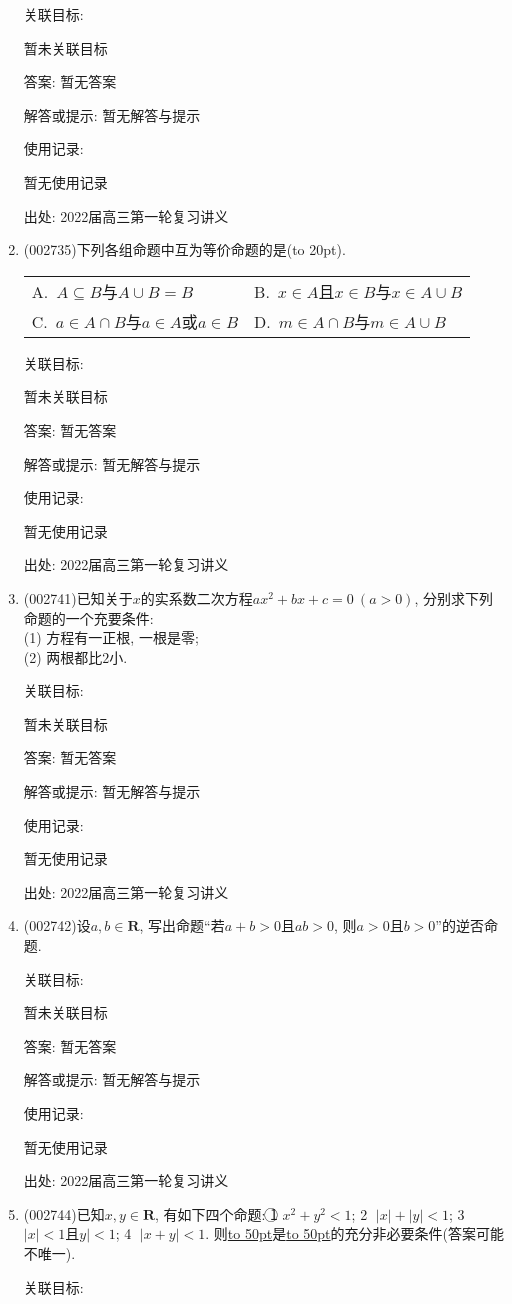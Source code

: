 \documentclass[10pt,a4paper]{article}
\newcommand{\blank}[1]{\underline{\hbox to #1pt{}}}
\newcommand{\bracket}[1]{(\hbox to #1pt{})}
\newcommand{\twoch}[4]{\par\begin{tabular}{p{.46\textwidth}p{.46\textwidth}}
A.~#1& B.~#2\\
C.~#3& D.~#4
\end{tabular}}
\begin{document}
\begin{enumerate}[1.]
关联目标:

暂未关联目标

答案: 暂无答案

解答或提示: 暂无解答与提示

使用记录:

暂无使用记录


出处: 2022届高三第一轮复习讲义
\item { (002735)}下列各组命题中互为等价命题的是\bracket{20}.
\twoch{$A\subseteq B$与$A\cup B=B$}{$x\in A$且$x\in B$与$x\in A\cup B$}{$a\in A\cap B$与$a\in A$或$a\in B$}{$m\in A\cap B$与$m\in A\cup B$}


关联目标:

暂未关联目标

答案: 暂无答案

解答或提示: 暂无解答与提示

使用记录:

暂无使用记录


出处: 2022届高三第一轮复习讲义
\item { (002741)}已知关于$x$的实系数二次方程$a x^2 +bx+c=0\ (a>0)$, 分别求下列命题的一个充要条件:\\
(1) 方程有一正根, 一根是零;\\
(2) 两根都比$2$小.


关联目标:

暂未关联目标

答案: 暂无答案

解答或提示: 暂无解答与提示

使用记录:

暂无使用记录


出处: 2022届高三第一轮复习讲义
\item { (002742)}设$a,b\in \mathbf{R}$, 写出命题``若$a+b>0$且$ab>0$, 则$a>0$且$b>0$''的逆否命题.


关联目标:

暂未关联目标

答案: 暂无答案

解答或提示: 暂无解答与提示

使用记录:

暂无使用记录


出处: 2022届高三第一轮复习讲义
\item { (002744)}已知$x,y\in \mathbf{R}$, 有如下四个命题: \textcircled{1} $x^2+y^2<1$; \textcircled{2} $|x|+|y|<1$; \textcircled{3} $|x|<1$且$y|<1$; \textcircled{4} $|x+y|<1$. 则\blank{50}是\blank{50}的充分非必要条件(答案可能不唯一).


关联目标:


\end{enumerate}
\end{document}
